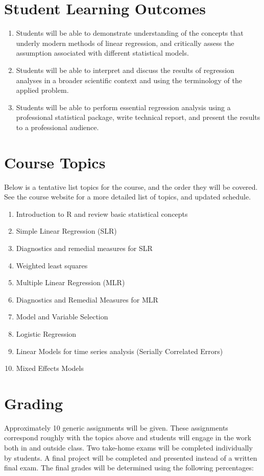 \documentclass[11pt,onecolumn]{article}
\begin{document}
\section*{Student Learning Outcomes}
\begin{enumerate}
\item Students will be able to demonstrate understanding of the concepts that underly modern methods of linear regression, and critically assess the assumption associated with different statistical models.
\item Students will be able to interpret and discuss the results of regression analyses in a broader scientific context and using the terminology of the applied problem.
\item Students will be able to perform essential regression analysis using a professional statistical package, write technical report, and present the results to a professional audience.
\end{enumerate}

\section*{Course Topics}
Below is a tentative list topics for the course, and the order they will be covered. See the course website for a more detailed list of topics, and updated schedule.
\begin{enumerate}
\item Introduction to R and review basic statistical concepts
  \item Simple Linear Regression (SLR)
  \item Diagnostics and remedial measures for SLR
    \item Weighted least squares
\item Multiple Linear Regression (MLR)
\item Diagnostics and Remedial Measures for MLR
\item Model and Variable Selection
\item Logistic Regression
\item Linear Models for time series analysis (Serially Correlated Errors)
  \item Mixed Effects Models
\end{enumerate}

\section*{Grading}
Approximately 10 generic assignments will be given. These assignments correspond roughly with the topics above and students will engage in the work both in and outside class. Two take-home exams will be completed individually by students. A final project will be completed and presented instead of a written final exam. The final grades will be determined using the following percentages:
\end{document}
